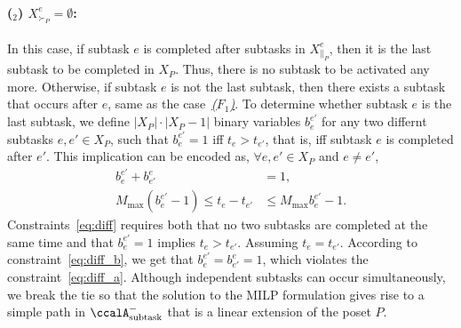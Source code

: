 \documentclass[Afour,sageh,times]{sagej}
\newcounter{mycounter}
\newcommand{\auto}[1]{\ccalA_{\textup{#1}}}
\begin{document}
{{{\paragraph{($_2$) $ X^e_{\succ_{P}} = \emptyset$:}\label{activation:b} In this case, if subtask $e$ is completed after  subtasks in  $X_{\|_P}^e$, then it is the last  subtask  to be completed in  $X_P$. Thus, there is no subtask to be activated any more. Otherwise, if subtask $e$ is not the last subtask, then there exists a subtask that occurs after $e$, same as the case~\hyperref[activation:a]{\it ($F_1$)}. To determine whether subtask $e$ is the last subtask, we define $|X_P|\cdot |X_P -1|$ binary variables $b_{e}^{e'}$ for any two differnt subtasks  $e, e' \in X_P$,  such that $b_{e}^{e'}=1$  iff $t_{e} > t_{e'}$, that is, iff subtask $e$ is completed after $e'$. This implication can be encoded as, $\forall e, e' \in X_P $ and $e\neq e'$,
\begingroup\makeatletter\def\f@size{10}\check@mathfonts
\def\maketag@@@#1{\hbox{\m@th\normalsize\normalfont#1}}%
\begin{subequations}\label{eq:diff}
  \begin{align}
    b_e^{e'} + b_{e'}^e &  = 1, \label{eq:diff_a}\\
  M_{\text{max}} (b_{e}^{e'} - 1) \leq t_e -  t_{e'} & \leq M_{\text{max}} b_{e}^{e'} - 1. \label{eq:diff_b}
\end{align}
\end{subequations}
\endgroup
Constraints~\eqref{eq:diff} requires both that  no two subtasks are completed at the same time and that $b_e^{e'}=1$ implies $t_e > t_{e'}$. Assuming $t_e = t_{e'}$. According to constraint~\eqref{eq:diff_b}, we get that $b_e^{e'}=b_{e'}^{e}=1$, which violates the constraint~\eqref{eq:diff_a}. Although independent subtasks can occur simultaneously, we break the tie so that the solution to the MILP formulation gives rise to a simple path in $\auto{subtask}^-$ that is a linear extension of the poset $P$.%

}}}
\end{document}
